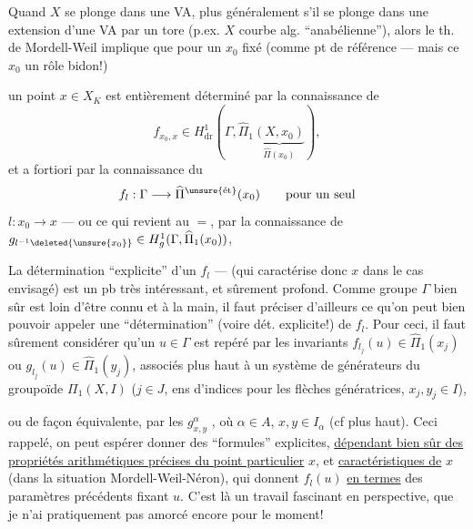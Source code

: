 
Quand $X$ se plonge dans une VA, plus généralement s'il se plonge dans une extension d'une VA par un tore (p.ex. $X$ courbe alg. ``anabélienne''), alors le th. de Mordell-Weil implique que pour un $x_0$  fixé (comme pt de référence --- mais ce $x_0$   un rôle bidon!)

un point $x\in X_K$ est entièrement déterminé par la connaissance de 
\[
f_{x_0,x}\in H^1_{\mathrm{dr}}(\Gamma,\widehat\Pi_1\underbrace{(X,x_0)}_{\widehat\Pi(x_0)}),
\]
et a fortiori par la connaissance du 
\[
f_l:\Gamma\longrightarrow\widehat\Pi^{\unsure{\text{ét}}}(x_0)\qquad\text{pour un seul}
\]
$l:x_0\longrightarrow x$ --- ou ce qui revient au $=$, par la connaissance de $g_{l^{-1}\deleted{\unsure{x_0}}}\in H^1_g(\Gamma,\widehat\Pi_1(x_0))$, 

 La détermination ``explicite'' d'un $f_l$ ---  (qui caractérise donc $x$ dans le cas envisagé) est un pb très intéressant, et sûrement profond. Comme   groupe $\Gamma$ bien sûr est loin d'être connu et à la main, il faut préciser d'ailleurs ce qu'on peut bien pouvoir appeler une ``détermination'' (voire dét. explicite!) de $f_l$. Pour ceci, il faut sûrement considérer qu'un $u\in\Gamma$ est repéré par les invariants $f_{l_j}(u)\in\widehat\Pi_1(x_j)$ ou $g_{l_j}(u)\in\widehat\Pi_1(y_j)$, associés plus haut à un système  de générateurs  du groupoïde $\Pi_1(X,I)$ ($j\in J$, ens d'indices pour les flèches génératrices, $x_j,y_j\in I$),

ou de façon équivalente, par les $g^\alpha_{x,y}$ \inserted{$\in\widehat\Pi_\alpha$}, où $\alpha\in A$, $x,y\in I_\alpha$ (cf plus haut). Ceci rappelé,
on peut espérer donner des ``formules'' explicites, \uline{dépendant bien sûr des propriétés arithmétiques précises du point particulier} $x$, et \uline{caractéristiques de} $x$ (dans la situation Mordell-Weil-Néron), qui donnent $f_l(u)$ \uline{en termes} des paramètres précédents fixant $u$. C'est là un travail fascinant en perspective, que je n'ai pratiquement pas amorcé encore pour le moment!

